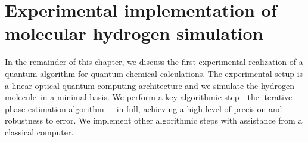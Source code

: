 \documentclass[11pt,oneside,final]{huthesis}%
\begin{document}







\section{Experimental implementation of molecular hydrogen simulation}
In the remainder of this chapter, we discuss the first experimental realization of a quantum algorithm for
quantum chemical calculations. The experimental setup is a linear-optical quantum computing
architecture and we simulate
the hydrogen molecule\ in a minimal basis.
We perform a key
algorithmic step---the iterative phase estimation 
algorithm~\cite{Lidar99,Aspuru05,Brown06,Clark09}---in
full, achieving a high level of precision and robustness to error.
We implement other algorithmic steps with assistance from a classical
computer.
\end{document}
